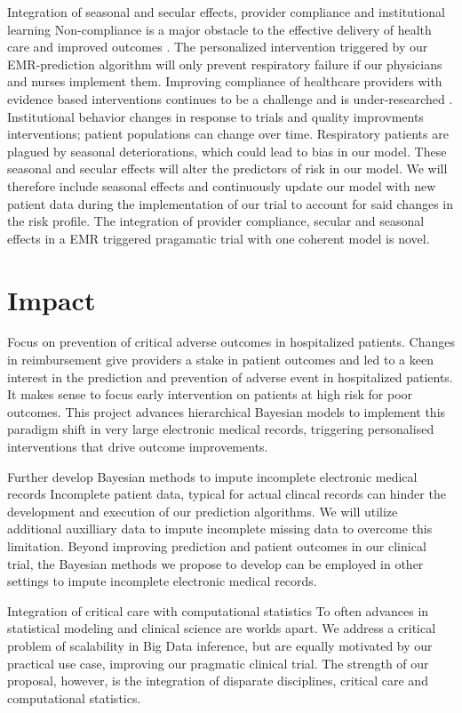 \documentclass[11pt,notitlepage]{article}
\begin{document}
Integration of seasonal and secular effects, provider compliance and institutional learning 
Non-compliance is a major obstacle to the effective delivery of health care and improved outcomes \cite{Duncan_16710766}. The personalized intervention triggered by our EMR-prediction algorithm will only prevent respiratory failure if our physicians and nurses implement them. Improving compliance of healthcare providers with evidence based interventions continues to be a challenge and is under-researched \cite{Davis_7650822}. Institutional behavior changes in response to trials and quality improvments interventions; patient populations can change over time. Respiratory patients are plagued by seasonal deteriorations, which could lead to bias in our model. These seasonal and secular effects will alter the predictors of risk in our model. We will therefore include seasonal effects and continuously update our model with new patient data during the implementation of our trial to account for said changes in the risk profile. The integration of provider compliance, secular and seasonal effects in a EMR triggered pragamatic trial with one coherent model is novel. 

\section{Impact}

Focus on prevention of critical adverse outcomes in hospitalized patients.
Changes in reimbursement give providers a stake in patient outcomes and led to a keen interest in the prediction and prevention of adverse event in hospitalized patients. It makes sense to focus early intervention on patients at high risk for poor outcomes. This project advances hierarchical Bayesian models to implement this paradigm shift in very large electronic medical records, triggering personalised interventions that drive outcome improvements.

Further develop Bayesian methods to impute incomplete electronic medical records
Incomplete patient data, typical for actual clincal records can hinder the development and execution of our prediction algorithms. We will utilize additional auxilliary data to impute incomplete missing data to overcome this limitation. Beyond improving prediction and patient outcomes in our clinical trial, the Bayesian methods we propose to develop can be employed in other settings to impute incomplete electronic medical records.

Integration of critical care with computational statistics
To often advances in statistical modeling and clinical science are worlds apart. We address a critical problem of scalability in Big Data inference, but are equally motivated by our practical use case, improving our pragmatic clinical trial. The strength of our proposal, however, is the integration of disparate disciplines, critical care and computational statistics. 
\end{document}
